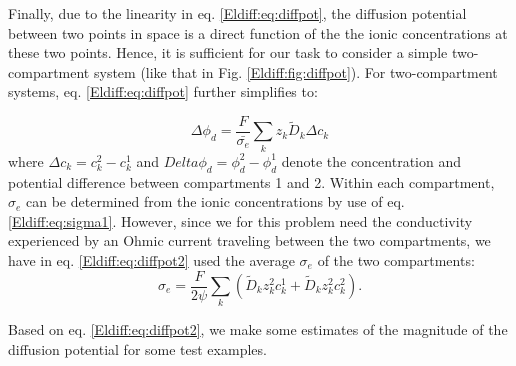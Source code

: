 Finally, due to the linearity in eq. \ref{Eldiff:eq:diffpot}, the diffusion potential between two points in space is a direct function of the the ionic concentrations at these two points. Hence, it is sufficient for our task to consider a simple two-compartment system (like that in Fig. \ref{Eldiff:fig:diffpot}). For two-compartment systems, eq. \ref{Eldiff:eq:diffpot} further simplifies to:

\begin{equation}
\Delta \phi_d = \frac{F}{\bar{\sigma_e}} \sum_k{z_k \tilde{D}_k \Delta c_k}
\label{Eldiff:eq:diffpot2}
\end{equation}
where $\Delta c_k = c_{k}^{2} - c_{k}^{1}$ and $Delta \phi_d = \phi_d^{2} - \phi_d^{1}$ denote the concentration and potential difference between compartments 1 and 2. Within each compartment, $\sigma_e$ can be determined from the ionic concentrations by use of eq. \ref{Eldiff:eq:sigma1}. However, since we for this problem need the conductivity experienced by an Ohmic current traveling between the two compartments, we have in eq. \ref{Eldiff:eq:diffpot2} used the average $\sigma_e$ of the two compartments:
\begin{equation}
\sigma_e = \frac{F}{2\psi}\sum_{k} \left(\tilde{D}_k z_{k}^2 c_{k}^{1} + \tilde{D}_k z_{k}^2 c_{k}^{2} \right).
\label{Eldiff:eq:sigma2}
\end{equation}

Based on eq. \ref{Eldiff:eq:diffpot2}, we make some estimates of the magnitude of the diffusion potential for some test examples.

